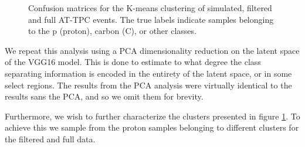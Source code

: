 \begin{figure}
\centering

	\hspace{-1cm}
	\hspace{-1cm}
\caption[Pre-trained network - confusion matrices]{Confusion matrices for the K-means clustering of simulated, filtered and full AT-TPC events. The true labels indicate samples belonging to the p (proton), carbon (C), or other classes. }\label{fig:clster_confmat}
\end{figure}

We repeat this analysis using a PCA dimensionality reduction on the latent space of the VGG16 model. This is done to estimate to what degree the class separating information is encoded in the entirety of the latent space, or in some select regions. The results from the PCA analysis were virtually identical to the results sans the PCA, and so we omit them for brevity. 

Furthermore, we wish to further characterize the clusters presented in figure \ref{fig:clster_confmat}. To achieve this we sample from the proton samples belonging to different clusters for the filtered and full data.

